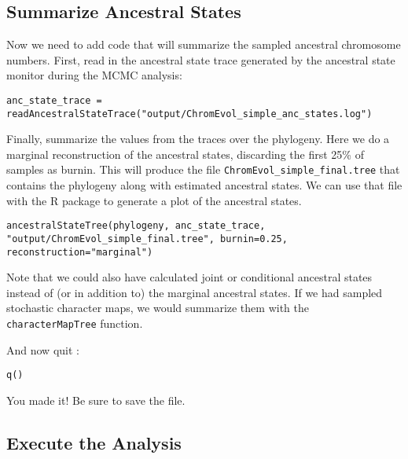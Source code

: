 \medskip
\subsection{Summarize Ancestral States}

Now we need to add \Rev code that will summarize the sampled ancestral chromosome
numbers. First, read in the ancestral state trace generated by the ancestral state
monitor during the MCMC analysis:
{\tt \begin{snugshade*}
\begin{lstlisting}
anc_state_trace = readAncestralStateTrace("output/ChromEvol_simple_anc_states.log")
\end{lstlisting}
\end{snugshade*}}

Finally, summarize the values from the traces over the phylogeny.
Here we do a marginal reconstruction of the ancestral states, discarding the first 25\% of samples
as burnin. This will produce the file \texttt{ChromEvol\_simple\_final.tree} that contains
the phylogeny along with estimated ancestral states. 
We can use that file with the \RevGadgets R package to generate a plot of the ancestral states.

{\tt \begin{snugshade*}
\begin{lstlisting}
ancestralStateTree(phylogeny, anc_state_trace, "output/ChromEvol_simple_final.tree", burnin=0.25, reconstruction="marginal")
\end{lstlisting}
\end{snugshade*}}
Note that we could also have calculated joint or conditional ancestral states instead of (or in
addition to) the marginal ancestral states.
If we had sampled stochastic character maps, we would summarize them with the \texttt{characterMapTree}
function.


And now quit \RevBayes:
{\tt \begin{snugshade*}
\begin{lstlisting}
q()
\end{lstlisting}
\end{snugshade*}}

{\begin{framed}
You made it! Be sure to save the file.
\end{framed}}

\bigskip
\subsection{Execute the \RevBayes Analysis}\label{subsect:Exercise-RunMCMC}

